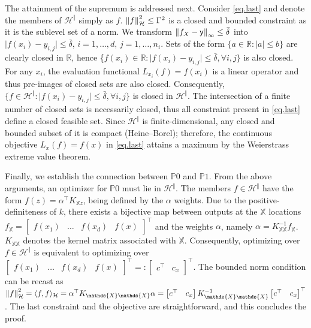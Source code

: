 \begin{my_proof}
	The attainment of the supremum is addressed next. Consider \eqref{eq.last} and denote the members of $\mathcal{H}^\Vert$ simply as $f$. $\left\| f \right\|_\mathcal{H}^2 \leq \Gamma^2$ is a closed and bounded constraint as it is the sublevel set of a norm. We transform $\left\| f_{X} - \mathsf{y} \right\|_\infty \leq \bar \delta$ into $\vert f(x_i) - y_{i,j} \vert \leq \bar \delta$, $i=1,\dots,d, \, j =1,\dots,n_i$. Sets of the form $\{a \in \mathbb{R}: \vert a \vert \leq b \}$ are clearly closed in $\mathbb{R}$, hence \{$f(x_i) \in \mathbb{R} : \vert f(x_i) - y_{i,j}\vert \leq \bar \delta, \forall i,j \}$ is also closed. For any $x_i$, the evaluation functional $L_{x_i}(f) = f(x_i)$ is a linear operator and thus pre-images of closed sets are also closed. Consequently, $\{f \in \mathcal{H}^\Vert : \vert f(x_i) - y_{i,j}\vert \leq \bar \delta, \forall i,j \}$ is closed in $\mathcal{H}^\Vert$. The intersection of a finite number of closed sets is necessarily closed, thus all constraint present in \eqref{eq.last} define a closed feasible set. Since $\mathcal{H}^{\Vert}$ is finite-dimensional, any closed and bounded subset of it is compact (Heine–Borel); therefore, the continuous objective $L_x(f) = f(x)$ in \eqref{eq.last} attains a maximum by the Weierstrass extreme value theorem. 
	
	Finally, we establish the connection between $\mathds{P}0$ and $\mathds{P}1$. From the above arguments, an optimizer for $\mathds{P}0$ must lie in $\mathcal{H}^\Vert$. The members $f \in \mathcal{H}^\Vert$ have the form $f(z) = \alpha^\top K_{\mathds{X}z}$, being defined by the $\alpha$ weights. Due to the positive-definiteness of $k$, there exists a bijective map between outputs at the $\mathds{X}$ locations $f_{\mathds{X}} = \begin{bmatrix} f(x_1) & \dots & f(x_d) & f(x) \end{bmatrix}^\top$ and the weights $\alpha$, namely $\alpha = K_{\mathds{X}\mathds{X}}^{-1}f_{\mathds{X}}$. $K_{\mathds{X}\mathds{X}}$ denotes the kernel matrix associated with $\mathds{X}$. Consequently, optimizing over $f \in \mathcal{H}^\Vert$ is equivalent to optimizing over $\begin{bmatrix} f(x_1) & \dots & f(x_d) & f(x) \end{bmatrix}^\top =: \begin{bmatrix}c^\top & c_x\end{bmatrix}^\top$. The bounded norm condition can be recast as $\rknorm{f}^2 = \rkinner{f}{f} = \alpha^\top K_{\mathds{X}\mathds{X}} \alpha = \begin{bmatrix}c^\top & c_x\end{bmatrix} K_{\mathds{X}\mathds{X}}^{-1} \begin{bmatrix}c^\top & c_x\end{bmatrix}^\top$. The last constraint and the objective are straightforward, and this concludes the proof.
\end{my_proof}


